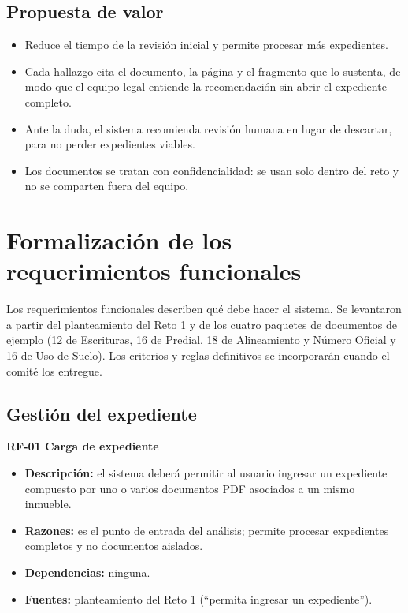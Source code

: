 \documentclass[11pt, a4paper]{article}
\begin{document}
\subsection*{Propuesta de valor}
\begin{itemize}
    \item Reduce el tiempo de la revisión inicial y permite procesar más expedientes.
    \item Cada hallazgo cita el documento, la página y el fragmento que lo sustenta, de modo que el equipo legal entiende la recomendación sin abrir el expediente completo.
    \item Ante la duda, el sistema recomienda revisión humana en lugar de descartar, para no perder expedientes viables.
    \item Los documentos se tratan con confidencialidad: se usan solo dentro del reto y no se comparten fuera del equipo.
\end{itemize}

\section{Formalización de los requerimientos funcionales}

Los requerimientos funcionales describen qué debe hacer el sistema. Se levantaron a partir del planteamiento del Reto 1 y de los cuatro paquetes de documentos de ejemplo (12 de Escrituras, 16 de Predial, 18 de Alineamiento y Número Oficial y 16 de Uso de Suelo). Los criterios y reglas definitivos se incorporarán cuando el comité los entregue.

\subsection*{Gestión del expediente}

\textbf{RF-01 Carga de expediente}
\begin{itemize}
    \item \textbf{Descripción:} el sistema deberá permitir al usuario ingresar un expediente compuesto por uno o varios documentos PDF asociados a un mismo inmueble.
    \item \textbf{Razones:} es el punto de entrada del análisis; permite procesar expedientes completos y no documentos aislados.
    \item \textbf{Dependencias:} ninguna.
    \item \textbf{Fuentes:} planteamiento del Reto 1 (``permita ingresar un expediente'').
\end{itemize}
\end{document}
